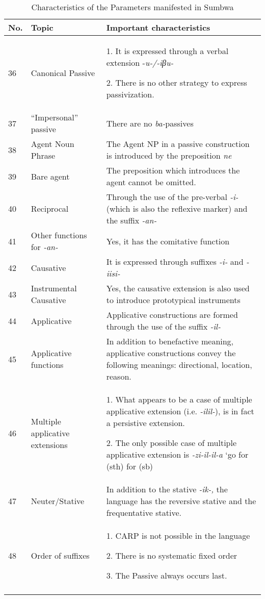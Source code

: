 \documentclass[output=paper		  ]{langscibook}
\begin{document}
\begin{table}
\begin{tabularx}{\textwidth}{l>{\raggedright\arraybackslash}p{}Q}

\lsptoprule

{No.} & {Topic} & Important characteristics\\\midrule
{ {36}} & Canonical Passive & { {1. It is expressed through a verbal extension -}{\textit{u-/-iβu-}}}

2. There is no other strategy to express passivization.\\
37 & ``Impersonal'' passive & { {There are no} {\textit{ba-}}{passives} }\\
38 & Agent Noun Phrase & { {The Agent NP in a passive construction is introduced by the preposition} {\textit{ne}}}\\
39 & Bare agent & { {The preposition which introduces the agent cannot be omitted.}}\\
40 & Reciprocal & { {Through the use of the pre-verbal} {\textit{{}-i-}} {(which is also the reflexive marker) and the suffix} {\textit{{}-an-}}}\\
41 & { {Other functions for} {\textit{{}-an-}}} & { {Yes, it has the comitative function}}\\
42 & Causative & { {It is expressed through suffixes} {\textit{{}-i-}} {and} {\textit{{}-iisi-}}}\\
43 & Instrumental Causative & Yes, the causative extension is also used to introduce prototypical instruments\\
44 & Applicative & { {Applicative constructions are formed through the use of the suffix} {\textit{{}-il-}}}\\
45 & Applicative functions & { {In addition to benefactive meaning, applicative constructions convey the following meanings: directional, location, reason.}}\\
46 & Multiple applicative extensions & { {1. What appears to be a case of multiple applicative extension (i.e.} {\textit{{}-ilil-}}{), is in fact a persistive extension.}}

{ {2. The only possible case of multiple applicative extension is}{ \textit{-zi-il-il-a} }{‘go for (sth) for (sb)}}\\
47 & Neuter/Stative & { {In addition to the stative} {\textit{{}-ik-,} }{the language has the reversive stative and the frequentative stative.}}\\
48 & Order of suffixes & { {1. CARP is not possible in the language}}

{ {2. There is no systematic fixed order}}

{ {3. The Passive always occurs last.}}\\
\lspbottomrule
\end{tabularx}
\caption{Characteristics of the Parameters manifested in Sumbwa}
\label{tab:kahigi:4}
\end{table}
\end{document}
